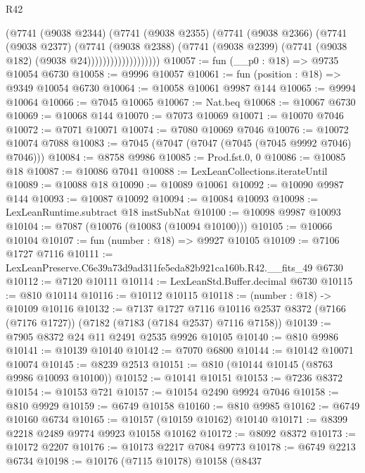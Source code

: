 \begin{lexlean}{R42}
\begin{coremodule}
{                          (@7741
                            (@9038 @2344)
                            (@7741
                              (@9038 @2355)
                              (@7741
                                (@9038 @2366)
                                (@7741
                                  (@9038 @2377)
                                  (@7741
                                    (@9038 @2388)
                                    (@7741
                                      (@9038 @2399)
                                      (@7741 (@9038 @182) (@9038 @24)))))))))))))))))))
@10057 := fun (__p0 : @18) => @9735 @10054 @6730
@10058 := @9996 @10057
@10061 := fun (position : @18) => @9349 @10054 @6730
@10064 := @10058 @10061 @9987 @144
@10065 := @9994 @10064
@10066 := @7045 @10065
@10067 := Nat.beq
@10068 := @10067 @6730
@10069 := @10068 @144
@10070 := @7073 @10069
@10071 := @10070 @7046
@10072 := @7071 @10071
@10074 := @7080 @10069 @7046
@10076 := @10072 @10074 @7088
@10083 := @7045 (@7047 (@7047 (@7045 (@7045 @9992 @7046) @7046)))
@10084 := @8758 @9986
@10085 := Prod.fst.{0, 0}
@10086 := @10085 @18
@10087 := @10086 @7041
@10088 := LexLeanCollections.iterateUntil
@10089 := @10088 @18
@10090 := @10089 @10061
@10092 := @10090 @9987 @144
@10093 := @10087 @10092
@10094 := @10084 @10093
@10098 := LexLeanRuntime.subtract @18 instSubNat
@10100 := @10098 @9987 @10093
@10104 := @7087 (@10076 (@10083 (@10094 @10100)))
@10105 := @10066 @10104
@10107 := fun (number : @18) => @9927 @10105
@10109 := @7106 @1727 @7116
@10111 := LexLeanPreserve.C6e39a73d9ad311fe5eda82b921ca160b.R42.__fits_49 @6730
@10112 := @7120 @10111
@10114 := LexLeanStd.Buffer.decimal @6730
@10115 := @810 @10114
@10116 := @10112 @10115
@10118 := (number : @18) -> @10109 @10116
@10132 := @7137
    @1727
    @7116
    @10116
    @2537
    @8372
    (@7166 (@7176 @1727))
    (@7182 (@7183 (@7184 @2537) @7116 @7158))
@10139 := @7905 @8372 @24 @11 @2491 @2535 @9926 @10105
@10140 := @810 @9986
@10141 := @10139 @10140
@10142 := @7070 @6800
@10144 := @10142 @10071 @10074
@10145 := @8239 @2513
@10151 := @810 (@10144 @10145 (@8763 @9986 @10093 @10100))
@10152 := @10141 @10151
@10153 := @7236 @8372
@10154 := @10153 @721
@10157 := @10154 @2490 @9924 @7046
@10158 := @810 @9929
@10159 := @6749 @10158
@10160 := @810 @9985
@10162 := @6749 @10160 @6734
@10165 := @10157 (@10159 @10162) @10140
@10171 := @8399 @2218 @2489 @9774 @9923 @10158 @10162
@10172 := @8092 @8372
@10173 := @10172 @2207
@10176 := @10173 @2217 @7084 @9773
@10178 := @6749 @2213 @6734
@10198 := @10176
    (@7115 @10178)
    @10158
    (@8437
}
\end{coremodule}
\end{lexlean}

